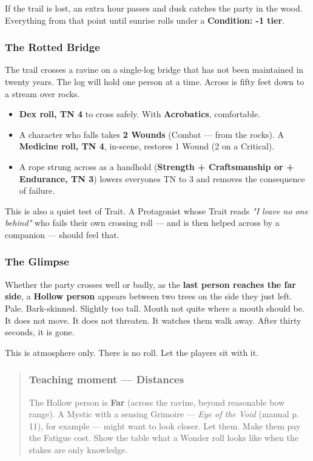 \documentclass[10pt,a4paper]{article}
\newcommand{\tightlist}{\setlength{\itemsep}{0pt}\setlength{\parskip}{0pt}}
\begin{document}
If the trail is lost, an extra hour passes and dusk catches the party in the wood. Everything from that point until sunrise rolls under a \textbf{Condition: -1 tier}.

\subsubsection{The Rotted Bridge}\label{the-rotted-bridge}

The trail crosses a ravine on a single-log bridge that has not been maintained in twenty years. The log will hold one person at a time. Across is fifty feet down to a stream over rocks.

\begin{itemize}
\tightlist
\item
  \textbf{Dex roll, TN 4} to cross safely. With \textbf{Acrobatics}, comfortable.
\item
  A character who falls takes \textbf{2 Wounds} (Combat --- from the rocks). A \textbf{Medicine roll, TN 4}, in-scene, restores 1 Wound (2 on a Critical).
\item
  A rope strung across as a handhold (\textbf{Strength + Craftsmanship or + Endurance, TN 3}) lowers everyone\textquotesingle s TN to 3 and removes the consequence of failure.
\end{itemize}

This is also a quiet test of Trait. A Protagonist whose Trait reads \emph{"I leave no one behind"} who fails their own crossing roll --- and is then helped across by a companion --- should feel that.

\subsubsection{The Glimpse}\label{the-glimpse}

Whether the party crosses well or badly, as the \textbf{last person reaches the far side}, a \textbf{Hollow person} appears between two trees on the side they just left. Pale. Bark-skinned. Slightly too tall. Mouth not quite where a mouth should be. It does not move. It does not threaten. It watches them walk away. After thirty seconds, it is gone.

This is atmosphere only. There is no roll. Let the players sit with it.

\begin{quote}
\subsubsection{Teaching moment --- Distances}\label{teaching-moment--distances}

The Hollow person is \textbf{Far} (across the ravine, beyond reasonable bow range). A Mystic with a sensing Grimoire --- \emph{Eye of the Void} (manual p. 11), for example --- might want to look closer. Let them. Make them pay the Fatigue cost. Show the table what a Wonder roll looks like when the stakes are only knowledge.
\end{quote}
\end{document}
